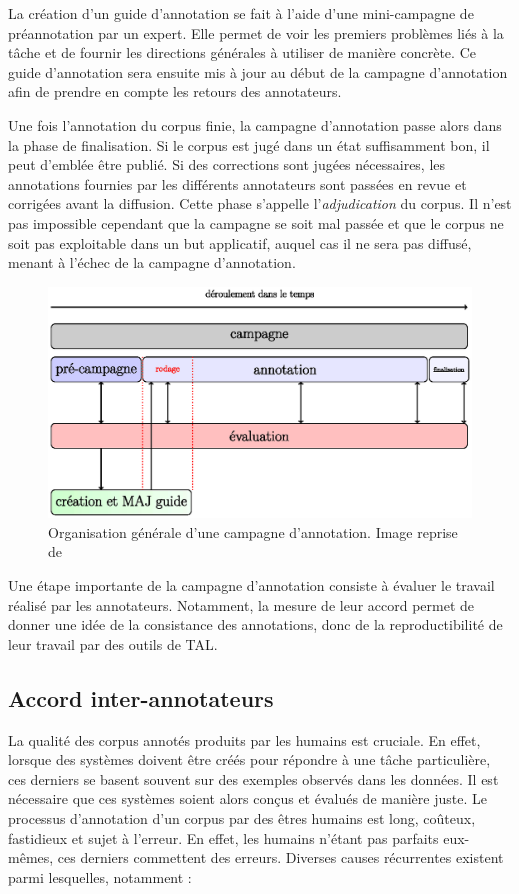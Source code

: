 \documentclass[12pt,a4paper,times,twoside,openright]{report}
\begin{document}
La création d'un guide d'annotation se fait à l'aide d'une mini-campagne de préannotation par un expert. Elle permet de voir les premiers problèmes liés à la tâche et de fournir les directions générales à utiliser de manière concrète. Ce guide d'annotation sera ensuite mis à jour au début de la campagne d'annotation afin de prendre en compte les retours des annotateurs.

Une fois l'annotation du corpus finie, la campagne d'annotation passe alors dans la phase de finalisation. Si le corpus est jugé dans un état suffisamment bon, il peut d'emblée être publié. Si des corrections sont jugées nécessaires, les annotations fournies par les différents annotateurs sont passées en revue et corrigées avant la diffusion. Cette phase s'appelle l'\emph{adjudication} du corpus. Il n'est pas impossible cependant que la campagne se soit mal passée et que le corpus ne soit pas exploitable dans un but applicatif, auquel cas il ne sera pas diffusé, menant à l'échec de la campagne d'annotation.

\begin{figure}[ht!]
    \centering
    \includegraphics[scale=1.0]{images/fort/campaign}
    \caption{Organisation générale d'une campagne d'annotation. Image reprise de \citet{fort2012ressources}}
    \label{fig:campaign-organisation}
\end{figure}

Une étape importante de la campagne d'annotation consiste à évaluer le travail réalisé par les annotateurs. Notamment, la mesure de leur accord permet de donner une idée de la consistance des annotations, donc de la reproductibilité de leur travail par des outils de TAL.


    
        \subsection{Accord inter-annotateurs}
        \label{subsec:inter-annotator-agreement}
La qualité des corpus annotés produits par les humains est cruciale. En effet, lorsque des systèmes doivent être créés pour répondre à une tâche particulière, ces derniers se basent souvent sur des exemples observés dans les données. Il est nécessaire que ces systèmes soient alors conçus et évalués de manière juste. Le processus d'annotation d'un corpus par des êtres humains est long, coûteux, fastidieux et sujet à l'erreur. En effet, les humains n'étant pas parfaits eux-mêmes, ces derniers commettent des erreurs. Diverses causes récurrentes existent parmi lesquelles, notamment :
\end{document}
